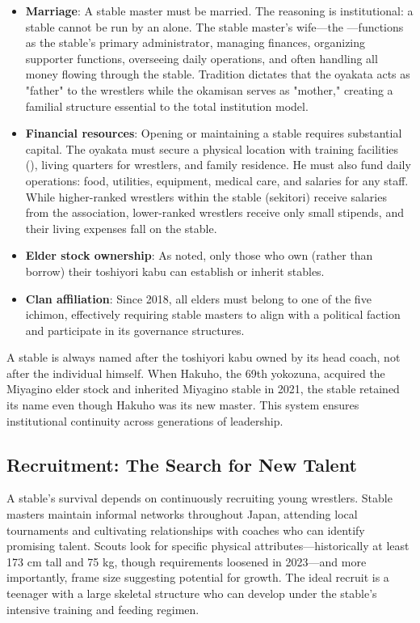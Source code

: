 \begin{itemize}
\item \textbf{Marriage}: A stable master must be married. The reasoning is institutional: a stable cannot be run by an  alone. The stable master's wife—the —functions as the stable's primary administrator, managing finances, organizing supporter functions, overseeing daily operations, and often handling all money flowing through the stable. Tradition dictates that the oyakata acts as "father" to the wrestlers while the okamisan serves as "mother," creating a familial structure essential to the total institution model.
\item \textbf{Financial resources}: Opening or maintaining a stable requires substantial capital. The oyakata must secure a physical location with training facilities (), living quarters for wrestlers, and family residence. He must also fund daily operations: food, utilities, equipment, medical care, and salaries for any staff. While higher-ranked wrestlers within the stable (sekitori) receive salaries from the association, lower-ranked wrestlers receive only small stipends, and their living expenses fall on the stable.
\item \textbf{Elder stock ownership}: As noted, only those who own (rather than borrow) their toshiyori kabu can establish or inherit stables.
\item \textbf{Clan affiliation}: Since 2018, all elders must belong to one of the five ichimon, effectively requiring stable masters to align with a political faction and participate in its governance structures.
\end{itemize}

A stable is always named after the toshiyori kabu owned by its head coach, not after the individual himself. When Hakuho, the 69th yokozuna, acquired the Miyagino elder stock and inherited Miyagino stable in 2021, the stable retained its name even though Hakuho was its new master. This system ensures institutional continuity across generations of leadership.

\subsection{Recruitment: The Search for New Talent}

A stable's survival depends on continuously recruiting young wrestlers. Stable masters maintain informal networks throughout Japan, attending local tournaments and cultivating relationships with coaches who can identify promising talent. Scouts look for specific physical attributes—historically at least 173 cm tall and 75 kg, though requirements loosened in 2023—and more importantly, frame size suggesting potential for growth. The ideal recruit is a teenager with a large skeletal structure who can develop under the stable's intensive training and feeding regimen.

